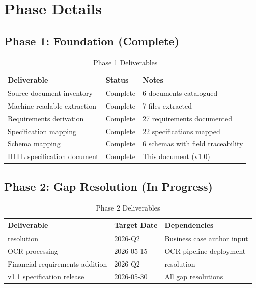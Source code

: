 \section{Phase Details}
\label{sec:phase-details}

\subsection{Phase 1: Foundation (Complete)}

\begin{table}[h]
\centering
\caption{Phase 1 Deliverables}
\label{tab:phase1-deliverables}
\begin{tabularx}{\textwidth}{@{}L{5cm}C{2.5cm}L{6cm}@{}}
\toprule
\textbf{Deliverable} & \textbf{Status} & \textbf{Notes} \\
\midrule
Source document inventory & Complete & 6 documents catalogued \\
Machine-readable extraction & Complete & 7 files extracted \\
Requirements derivation & Complete & 27 requirements documented \\
Specification mapping & Complete & 22 specifications mapped \\
Schema mapping & Complete & 6 schemas with field traceability \\
HITL specification document & Complete & This document (v1.0) \\
\bottomrule
\end{tabularx}
\end{table}

\subsection{Phase 2: Gap Resolution (In Progress)}

\begin{table}[h]
\centering
\caption{Phase 2 Deliverables}
\label{tab:phase2-deliverables}
\begin{tabularx}{\textwidth}{@{}L{5cm}C{2.5cm}L{6cm}@{}}
\toprule
\textbf{Deliverable} & \textbf{Target Date} & \textbf{Dependencies} \\
\midrule
{} resolution & 2026-Q2 & Business case author input \\
 OCR processing & 2026-05-15 & OCR pipeline deployment \\
Financial requirements addition & 2026-Q2 &  resolution \\
v1.1 specification release & 2026-05-30 & All gap resolutions \\
\bottomrule
\end{tabularx}
\end{table}

